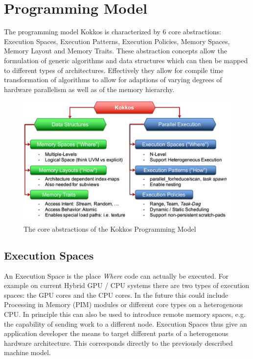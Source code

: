 
\chapter{Programming Model}

The programming model Kokkos is characterized by 6 core abstractions: Execution Spaces, Execution Patterns, Execution Policies, Memory Spaces, Memory Layout and Memory Traits. 
These abstraction concepts allow the formulation of generic algorithms and data structures which can then be mapped to different types of architectures. 
Effectively they allow for compile time transformation of algorithms to allow for adaptions of varying degrees of hardware parallelism as well as of the memory hierarchy. 

\begin{figure}[h]
\begin{center}
\includegraphics[clip, trim=1cm 5.5cm 12cm 2.5cm, width=\textwidth]{figures/kokkos-abstractions.pdf}
\caption{The core abstractions of the Kokkos Programming Model}
\label{fig:kokkosabstractions}
\end{center}
\end{figure}

\section{Execution Spaces}

An Execution Space is the place {\it Where} code can actually be executed. 
For example on current Hybrid GPU / CPU systems there are two types of execution spaces: the GPU cores and the CPU cores. 
In the future this could include Processing in Memory (PIM) modules or different core types on a heterogenous CPU.
In principle this can also be used to introduce remote memory spaces, e.g. the capability of sending work to a different node.
Execution Spaces thus give an application developer the means to target different parts of a heterogenous hardware architecture.
This corresponds directly to the previously described machine model.

